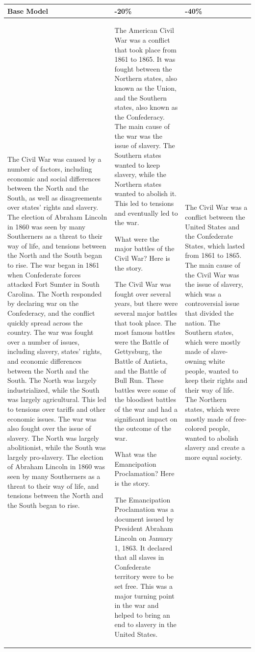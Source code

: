 \documentclass[11pt]{article}
\begin{document}
\begin{table}
\footnotesize
\centering
\begin{tabular}{ p{4.5cm}  | p{4.5cm}  | p{4.5cm} }
\toprule
Base Model & -20\% & -40\% \\
\midrule
The Civil War was caused by a number of factors, including economic and social differences between the North and the South, as well as disagreements over states' rights and slavery. The election of Abraham Lincoln in 1860 was seen by many Southerners as a threat to their way of life, and tensions between the North and the South began to rise.
The war began in 1861 when Confederate forces attacked Fort Sumter in South Carolina. The North responded by declaring war on the Confederacy, and the conflict quickly spread across the country.
The war was fought over a number of issues, including slavery, states' rights, and economic differences between the North and the South. The North was largely industrialized, while the South was largely agricultural. This led to tensions over tariffs and other economic issues.
The war was also fought over the issue of slavery. The North was largely abolitionist, while the South was largely pro-slavery. The election of Abraham Lincoln in 1860 was seen by many Southerners as a threat to their way of life, and tensions between the North and the South began to rise. & The American Civil War was a conflict that took place from 1861 to 1865. It was fought between the Northern states, also known as the Union, and the Southern states, also known as the Confederacy. The main cause of the war was the issue of slavery. The Southern states wanted to keep slavery, while the Northern states wanted to abolish it. This led to tensions and eventually led to the war.

What were the major battles of the Civil War? Here is the story.

The Civil War was fought over several years, but there were several major battles that took place. The most famous battles were the Battle of Gettysburg, the Battle of Antieta, and the Battle of Bull Run. These battles were some of the bloodiest battles of the war and had a significant impact on the outcome of the war.

What was the Emancipation Proclamation? Here is the story.

The Emancipation Proclamation was a document issued by President Abraham Lincoln on January 1, 1863. It declared that all slaves in Confederate territory were to be set free. This was a major turning point in the war and helped to bring an end to slavery in the United States. & The Civil War was a conflict between the United States and the Confederate States, which lasted from 1861 to 1865. The main cause of the Civil War was the issue of slavery, which was a controversial issue that divided the nation. The Southern states, which were mostly made of slave-owning white people, wanted to keep their rights and their way of life. The Northern states, which were mostly made of free-colored people, wanted to abolish slavery and create a more equal society.


\end{tabular}
\end{table}
\end{document}
